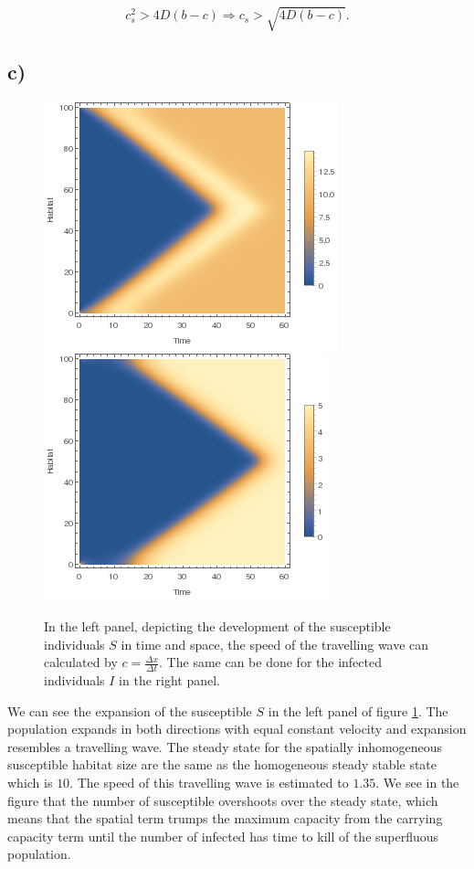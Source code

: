 $$
 c^2_s>4D(b-c)\Rightarrow c_s > \sqrt{4D(b-c)}.
 $$
 
\subsection*{c)}

\begin{figure}
\centering
\includegraphics[scale=0.5]{img/listdensityplot_S.png}
\includegraphics[scale=0.5]{img/listdensityplot_P.png}
\caption{\label{fig:pic1c} In the left panel, depicting the development of the susceptible individuals $S$ in time and space, the speed of the travelling wave can calculated by $c=\frac{\Delta x}{\Delta t}$. The same can be done for the infected individuals $I$ in the right panel.}
\end{figure}

We can see the expansion of the susceptible $S$ in the left panel of figure \ref{fig:pic1c}. The population expands in both directions with equal constant velocity and expansion resembles a travelling wave. The steady state for the spatially inhomogeneous susceptible habitat size are the same as the homogeneous steady stable state which is $10$. The speed of this travelling wave is estimated to $1.35$. We see in the figure that the number of susceptible overshoots over the steady state, which means that the spatial term trumps the maximum capacity from the carrying capacity term until the number of infected has time to kill of the superfluous population. \\

